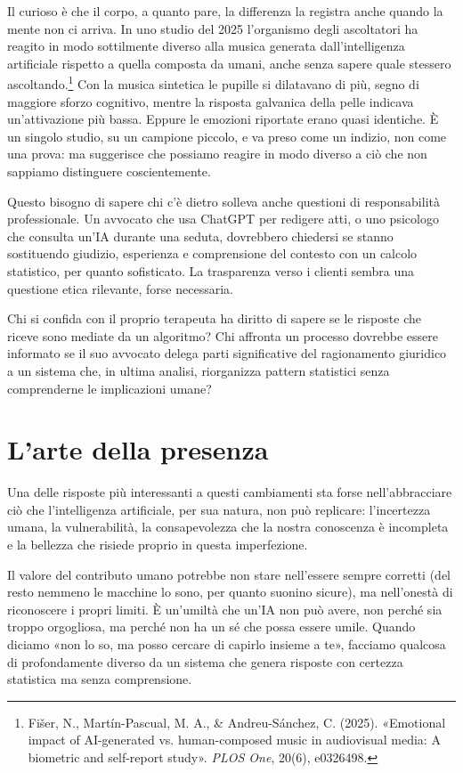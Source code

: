 Il curioso è che il corpo, a quanto pare, la differenza la registra anche quando la mente non ci arriva. In uno studio del 2025 l'organismo degli ascoltatori ha reagito in modo sottilmente diverso alla musica generata dall'intelligenza artificiale rispetto a quella composta da umani, anche senza sapere quale stessero ascoltando.\footnote{Fi\v{s}er, N., Mart\'{i}n-Pascual, M. A., \& Andreu-S\'{a}nchez, C. (2025). «Emotional impact of AI-generated vs. human-composed music in audiovisual media: A biometric and self-report study». \textit{PLOS One}, 20(6), e0326498.} Con la musica sintetica le pupille si dilatavano di più, segno di maggiore sforzo cognitivo, mentre la risposta galvanica della pelle indicava un'attivazione più bassa. Eppure le emozioni riportate erano quasi identiche. È un singolo studio, su un campione piccolo, e va preso come un indizio, non come una prova: ma suggerisce che possiamo reagire in modo diverso a ciò che non sappiamo distinguere coscientemente.

Questo bisogno di sapere chi c'è dietro solleva anche questioni di responsabilità professionale. Un avvocato che usa ChatGPT per redigere atti, o uno psicologo che consulta un'IA durante una seduta, dovrebbero chiedersi se stanno sostituendo giudizio, esperienza e comprensione del contesto con un calcolo statistico, per quanto sofisticato. La trasparenza verso i clienti sembra una questione etica rilevante, forse necessaria.

Chi si confida con il proprio terapeuta ha diritto di sapere se le risposte che riceve sono mediate da un algoritmo? Chi affronta un processo dovrebbe essere informato se il suo avvocato delega parti significative del ragionamento giuridico a un sistema che, in ultima analisi, riorganizza pattern statistici senza comprenderne le implicazioni umane?

\section{L'arte della presenza}

Una delle risposte più interessanti a questi cambiamenti sta forse nell'abbracciare ciò che l'intelligenza artificiale, per sua natura, non può replicare: l'incertezza umana, la vulnerabilità, la consapevolezza che la nostra conoscenza è incompleta e la bellezza che risiede proprio in questa imperfezione.




Il valore del contributo umano potrebbe non stare nell'essere sempre corretti (del resto nemmeno le macchine lo sono, per quanto suonino sicure), ma nell'onestà di riconoscere i propri limiti. È un'umiltà che un'IA non può avere, non perché sia troppo orgogliosa, ma perché non ha un sé che possa essere umile. Quando diciamo «non lo so, ma posso cercare di capirlo insieme a te», facciamo qualcosa di profondamente diverso da un sistema che genera risposte con certezza statistica ma senza comprensione.

